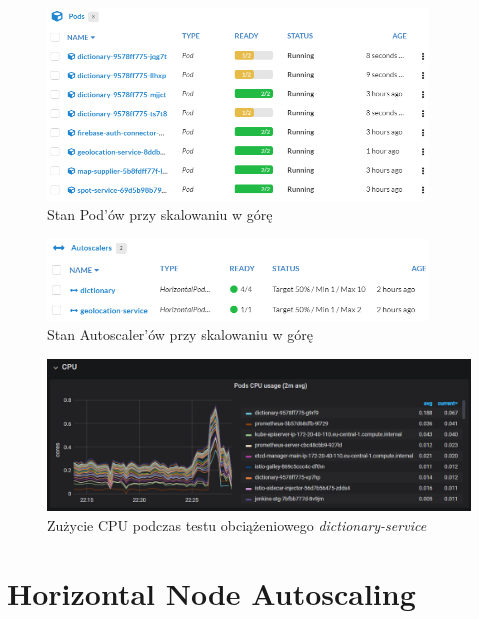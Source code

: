 \begin{figure}[!ht]
	\begin{center}
		\includegraphics[width=0.9\textwidth]{img/autoscaling/hpa-pods-scale-up}
	\end{center}
    \caption{Stan Pod'ów przy skalowaniu w górę}
\end{figure}

\begin{figure}[!ht]
	\begin{center}
		\includegraphics[width=0.9\textwidth]{img/autoscaling/hpa-autoscalers-scale-up}
	\end{center}
    \caption{Stan Autoscaler'ów przy skalowaniu w górę}
\end{figure}

\begin{figure}[!ht]
	\begin{center}
		\includegraphics[width=1\textwidth]{img/autoscaling/hpa-grafana-scale-up}
	\end{center}
    \caption{Zużycie CPU podczas testu obciążeniowego \emph{dictionary-service}}
\end{figure}

\section{Horizontal Node Autoscaling}

